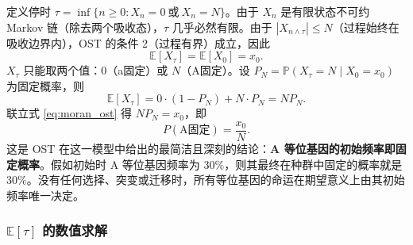 定义停时 $\tau = \inf\{n \geqslant 0: X_n = 0 \ \text{或}\ X_n = N\}$。由于 $X_n$ 是有限状态不可约 Markov 链（除去两个吸收态），$\tau$ 几乎必然有限。由于 $|X_{n \wedge \tau}| \leqslant N$（过程始终在吸收边界内），OST 的条件 2（过程有界）成立，因此
\begin{equation}\label{eq:moran_ost}
  \mathbb{E}[X_\tau] = \mathbb{E}[X_0] = x_0.
\end{equation}
$X_\tau$ 只能取两个值：0（a固定）或 $N$（A固定）。设 $P_N = \mathbb{P}(X_\tau = N \mid X_0 = x_0)$ 为固定概率，则
\begin{equation}
  \mathbb{E}[X_\tau] = 0 \cdot (1 - P_N) + N \cdot P_N = N P_N.
\end{equation}
联立式 \eqref{eq:moran_ost} 得 $N P_N = x_0$，即
\begin{equation}\label{eq:moran_fix}
  P(\text{A固定}) = \frac{x_0}{N}.
\end{equation}
这是 OST 在这一模型中给出的最简洁且深刻的结论：\textbf{A 等位基因的初始频率即固定概率}。假如初始时 A 等位基因频率为 30\%，则其最终在种群中固定的概率就是 30\%。没有任何选择、突变或迁移时，所有等位基因的命运在期望意义上由其初始频率唯一决定。

\subsubsection{$\mathbb{E}[\tau]$ 的数值求解}

